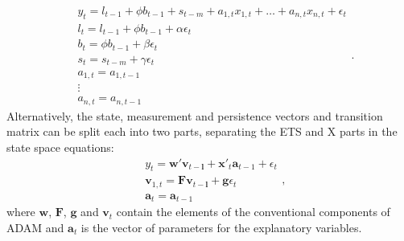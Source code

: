 \documentclass[
]{book}
\theoremstyle{definition}
\theoremstyle{definition}
\theoremstyle{definition}
\theoremstyle{definition}
\theoremstyle{remark}
\begin{document}
\begin{equation}
  \begin{aligned}
    & y_{t} = l_{t-1} + \phi b_{t-1} + s_{t-m} + a_{1,t} x_{1,t} + \dots + a_{n,t} x_{n,t} + \epsilon_t \\
    & l_t = l_{t-1} + \phi b_{t-1} + \alpha \epsilon_t \\
    & b_t = \phi b_{t-1} + \beta \epsilon_t \\
    & s_t = s_{t-m} + \gamma \epsilon_t \\
    & a_{1,t} = a_{1,t-1} \\
    & \vdots \\
    & a_{n,t} = a_{n,t-1}
  \end{aligned}.
  \label{eq:ETSXADAMAAA}
\end{equation}
Alternatively, the state, measurement and persistence vectors and transition matrix can be split each into two parts, separating the ETS and X parts in the state space equations:
\begin{equation}
  \begin{aligned}
    & {y}_{t} = \mathbf{w}' \mathbf{v}_{t-\mathbf{l}} + \mathbf{x}'_{t} \mathbf{a}_{t-1} + \epsilon_t \\
    & \mathbf{v}_{1,t} = \mathbf{F} \mathbf{v}_{t-\mathbf{l}} + \mathbf{g} \epsilon_t \\
    & \mathbf{a}_{t} = \mathbf{a}_{t-1}
  \end{aligned} ,
  \label{eq:ETSXADAMStateSpacePureAdditiveFullAlternative}
\end{equation}
where \(\mathbf{w}\), \(\mathbf{F}\), \(\mathbf{g}\) and \(\mathbf{v}_{t}\) contain the elements of the conventional components of ADAM and \(\mathbf{a}_{t}\) is the vector of parameters for the explanatory variables.
\end{document}
